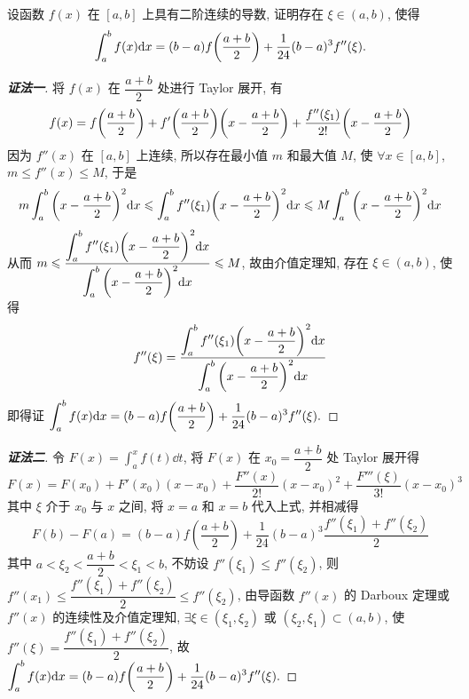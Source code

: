 \begin{example}
    设函数 $f(x)$ 在 $[a,b]$ 上具有二阶连续的导数, 证明存在 $\xi\in(a,b)$, 使得
    $$\int_{a}^{b}f(x)\dd x=(b-a)f\qty(\dfrac{a+b}{2})+\dfrac{1}{24}(b-a)^3f''(\xi).$$
\end{example}
\begin{proof}[{\songti \textbf{证法一}}]
    将 $f(x)$ 在 $\dfrac{a+b}{2}$ 处进行 Taylor 展开, 有
    $$f(x)=f\qty(\dfrac{a+b}{2})+f'\qty(\dfrac{a+b}{2})\qty(x-\dfrac{a+b}{2})+\dfrac{f''(\xi_1)}{2!}\qty(x-\dfrac{a+b}{2})$$
    因为 $f''(x)$ 在 $[a,b]$ 上连续, 所以存在最小值 $m$ 和最大值 $M$, 使 $\forall x\in[a,b]$, $m\leqslant f''(x) \leqslant M$, 于是
    $$m\int_{a}^{b}\qty(x-\dfrac{a+b}{2})^2\dd x\leqslant \int_{a}^{b}f''(\xi_1)\qty(x-\dfrac{a+b}{2})^2\dd x\leqslant M\int_{a}^{b}\qty(x-\dfrac{a+b}{2})^2\dd x$$
    从而 $\displaystyle m\leqslant \dfrac{\displaystyle \int_{a}^{b}f''(\xi_1)\qty(x-\dfrac{a+b}{2})^2\dd x}{\displaystyle \int_{a}^{b}\qty(x-\dfrac{a+b}{2})^2\dd x}\leqslant M$, 故由介值定理知, 存在 $\xi\in(a,b)$, 使得
    $$f''(\xi)=\dfrac{\displaystyle\int_{a}^{b}f''(\xi_1)\qty(x-\dfrac{a+b}{2})^2\dd x}{\displaystyle \int_{a}^{b}\qty(x-\dfrac{a+b}{2})^2\dd x}$$
    即得证 $\displaystyle\int_{a}^{b}f(x)\dd x=(b-a)f\qty(\dfrac{a+b}{2})+\dfrac{1}{24}(b-a)^3f''(\xi).$
\end{proof}
\begin{proof}[{\songti \textbf{证法二}}]
    令 $\displaystyle F(x)=\int_{a}^{x}f(t)\dd t$, 将 $F(x)$ 在 $x_0=\dfrac{a+b}{2}$ 处 Taylor 展开得
    $$F(x)  =F\left( x_{0}\right) +F'\left( x_{0}\right) \left( x-x_{0}\right) +\dfrac{F''(x)  }{2!}\left( x-x_{0}\right) ^{2}+\dfrac{F'''\left( \xi \right) }{3!}\left( x-x_{0}\right) ^{3}$$
    其中 $\xi$ 介于 $x_0$ 与 $x$ 之间, 将 $x=a$ 和 $x=b$ 代入上式, 并相减得
    $$F\left( b\right) -F\left( a\right) =\left( b-a\right) f\left( \dfrac{a+b}{2}\right) +\dfrac{1}{24}\left( b-a\right) ^{3}\dfrac{f''\left( \xi _{1}\right) +f''\left( \xi _{2}\right) }{2}$$
    其中 $a <\xi _{2} <\dfrac{a+b}{2} <\xi _{1} <b$, 不妨设 $f''(\xi_1)\leqslant f''(\xi_2)$, 则 $f''(x_1)\leqslant \dfrac{f''(\xi_1)+f''(\xi_2)}{2}\leqslant f''(\xi_2)$, 由导函数 $f''(x)$ 的 Darboux 定理或 $f''(x)$ 的连续性及介值定理知,
    $\exists\xi\in(\xi_1,\xi_2)$ 或 $(\xi_2,\xi_1)\subset (a,b)$, 使 $f''(\xi)=\dfrac{f''(\xi_1)+f''(\xi_2)}{2}$, 故 $\displaystyle\int_{a}^{b}f(x)\dd x=(b-a)f\qty(\dfrac{a+b}{2})+\dfrac{1}{24}(b-a)^3f''(\xi).$
\end{proof}

